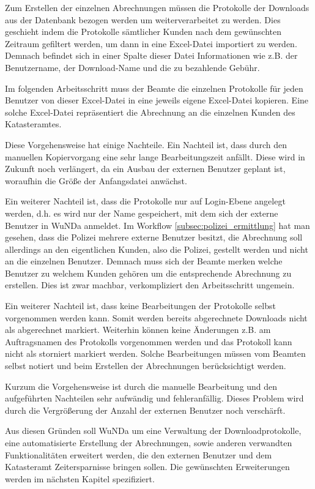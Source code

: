 Zum Erstellen der einzelnen Abrechnungen müssen die Protokolle der Downloads aus der Datenbank bezogen werden um weiterverarbeitet zu werden.
Dies geschieht indem die Protokolle sämtlicher Kunden nach dem gewünschten Zeitraum gefiltert werden, um dann in eine Excel-Datei importiert zu werden.
Demnach befindet sich in einer Spalte dieser Datei Informationen wie z.B. der Benutzername, der Download-Name und die zu bezahlende Gebühr.

Im folgenden Arbeitsschritt muss der Beamte die einzelnen Protokolle für jeden Benutzer von dieser Excel-Datei in eine jeweils eigene Excel-Datei kopieren. Eine solche Excel-Datei repräsentiert die Abrechnung an die einzelnen Kunden des Katasteramtes.

Diese Vorgehensweise hat einige Nachteile. Ein Nachteil ist, dass durch den manuellen Kopiervorgang eine sehr lange Bearbeitungszeit anfällt. Diese wird in Zukunft noch verlängert, da ein Ausbau der externen Benutzer geplant ist, woraufhin die Größe der Anfangsdatei anwächst.

Ein weiterer Nachteil ist, dass die Protokolle nur auf Login-Ebene angelegt werden, d.h. es wird nur der Name gespeichert, mit dem sich der externe Benutzer in \ac{WuNDa} anmeldet.
Im Workflow \ref{subsec:polizei_ermittlung} hat man gesehen, dass die Polizei mehrere externe Benutzer besitzt, die Abrechnung soll allerdings an den eigentlichen Kunden, also die Polizei, gestellt werden und nicht an die einzelnen Benutzer. Demnach muss sich der Beamte merken welche Benutzer zu welchem Kunden gehören um die entsprechende Abrechnung zu erstellen. Dies ist zwar machbar, verkompliziert den Arbeitsschritt ungemein.

Ein weiterer Nachteil ist, dass keine Bearbeitungen der Protokolle selbst vorgenommen werden kann. Somit werden bereits abgerechnete Downloads nicht als abgerechnet markiert. Weiterhin können keine Änderungen z.B. am Auftragsnamen des Protokolls vorgenommen werden und das Protokoll kann nicht als storniert markiert werden. Solche Bearbeitungen müssen vom Beamten selbst notiert und beim Erstellen der Abrechnungen berücksichtigt werden.

Kurzum die Vorgehensweise ist durch die manuelle Bearbeitung und den aufgeführten Nachteilen sehr aufwändig und fehleranfällig. Dieses Problem wird durch die Vergrößerung der Anzahl der externen Benutzer noch verschärft.

Aus diesen Gründen soll \ac{WuNDa} um eine Verwaltung der Downloadprotokolle, eine automatisierte Erstellung der Abrechnungen, sowie anderen verwandten Funktionalitäten erweitert werden, die den externen Benutzer und dem Katasteramt Zeitersparnisse bringen sollen. Die gewünschten Erweiterungen werden im nächsten Kapitel spezifiziert.



